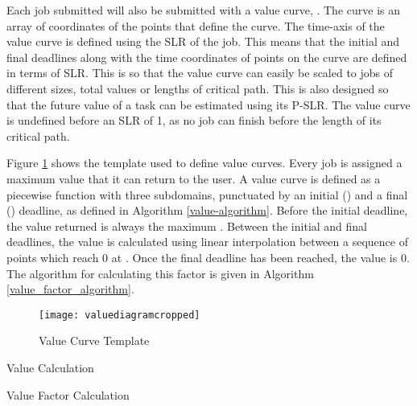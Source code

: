 \documentclass[english,british]{IEEEtran}
\begin{document}
Each job submitted will also be submitted with a value curve, .
The curve  is an array of coordinates of the points that define
the curve. The time-axis of the value curve is defined using the SLR
of the job. This means that the initial and final deadlines along
with the time coordinates of points on the curve are defined in terms
of SLR. This is so that the value curve can easily be scaled to jobs
of different sizes, total values or lengths of critical path. This
is also designed so that the future value of a task can be estimated
using its P-SLR. The value curve is undefined before an SLR of 1,
as no job can finish before the length of its critical path. 

Figure \ref{value-curve-template-pic} shows the template used to
define value curves. Every job is assigned a maximum value 
that it can return to the user. A value curve is defined as a piecewise
function with three subdomains, punctuated by an initial ()
and a final () deadline, as defined in Algorithm
\ref{value-algorithm}. Before the initial deadline, the value returned
is always the maximum . Between the initial and
final deadlines, the value is calculated using linear interpolation
between a sequence of points which reach 0 at .
Once the final deadline has been reached, the value is 0. The algorithm
for calculating this factor is given in Algorithm \ref{value_factor_algorithm}.

\begin{figure}
\noindent \begin{centering}
\texttt{[image: valuediagramcropped]}
\par\end{centering}

\protect\caption{Value Curve Template}


\label{value-curve-template-pic}
\end{figure}


\begin{algorithm}





\protect\caption{Value Calculation}


\label{value-algorithm}
\end{algorithm}


\begin{algorithm}


\quad{}

\quad{}

\quad{}

\quad{}

\quad{}

\quad{}

\quad{}

\quad{}

\quad{}

\protect\caption{Value Factor Calculation\label{value_factor_algorithm}}
\end{algorithm}
\end{document}
